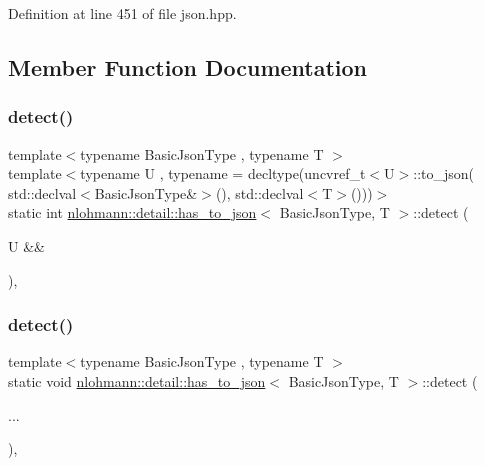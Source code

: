 Definition at line 451 of file json.\+hpp.



\subsection{Member Function Documentation}
\mbox{\label{structnlohmann_1_1detail_1_1has__to__json_af087d9dfdab8443f2b95e8b6c8612742}} 
\subsubsection{\texorpdfstring{detect()}{detect()}\hspace{0.1cm}{\footnotesize\ttfamily [1/2]}}
{\footnotesize\ttfamily template$<$typename Basic\+Json\+Type , typename T $>$ \\
template$<$typename U , typename  = decltype(uncvref\+\_\+t$<$\+U$>$\+::to\+\_\+json(                 std\+::declval$<$\+Basic\+Json\+Type\&$>$(), std\+::declval$<$\+T$>$()))$>$ \\
static int \hyperlink{structnlohmann_1_1detail_1_1has__to__json}{nlohmann\+::detail\+::has\+\_\+to\+\_\+json}$<$ Basic\+Json\+Type, T $>$\+::detect (\begin{DoxyParamCaption}\item[{U \&\&}]{ }\end{DoxyParamCaption})\hspace{0.3cm}{\ttfamily [static]}, {\ttfamily [private]}}

\mbox{\label{structnlohmann_1_1detail_1_1has__to__json_a133e6ab785874a224508769d960b1ab0}} 
\subsubsection{\texorpdfstring{detect()}{detect()}\hspace{0.1cm}{\footnotesize\ttfamily [2/2]}}
{\footnotesize\ttfamily template$<$typename Basic\+Json\+Type , typename T $>$ \\
static void \hyperlink{structnlohmann_1_1detail_1_1has__to__json}{nlohmann\+::detail\+::has\+\_\+to\+\_\+json}$<$ Basic\+Json\+Type, T $>$\+::detect (\begin{DoxyParamCaption}\item[{}]{... }\end{DoxyParamCaption})\hspace{0.3cm}{\ttfamily [static]}, {\ttfamily [private]}}



